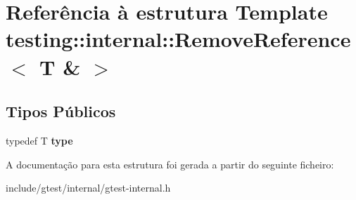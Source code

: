 \hypertarget{structtesting_1_1internal_1_1RemoveReference_3_01T_01_6_01_4}{\section{Referência à estrutura Template testing\-:\-:internal\-:\-:Remove\-Reference$<$ T \& $>$}
\label{structtesting_1_1internal_1_1RemoveReference_3_01T_01_6_01_4}
}
\subsection*{Tipos Públicos}
\begin{DoxyCompactItemize}
\item 
\hypertarget{structtesting_1_1internal_1_1RemoveReference_3_01T_01_6_01_4_a3d0f32a66759f333c2dd66aa31005e6d}{typedef T {\bfseries type}}\label{structtesting_1_1internal_1_1RemoveReference_3_01T_01_6_01_4_a3d0f32a66759f333c2dd66aa31005e6d}

\end{DoxyCompactItemize}


A documentação para esta estrutura foi gerada a partir do seguinte ficheiro\-:\begin{DoxyCompactItemize}
\item 
include/gtest/internal/gtest-\/internal.\-h\end{DoxyCompactItemize}
